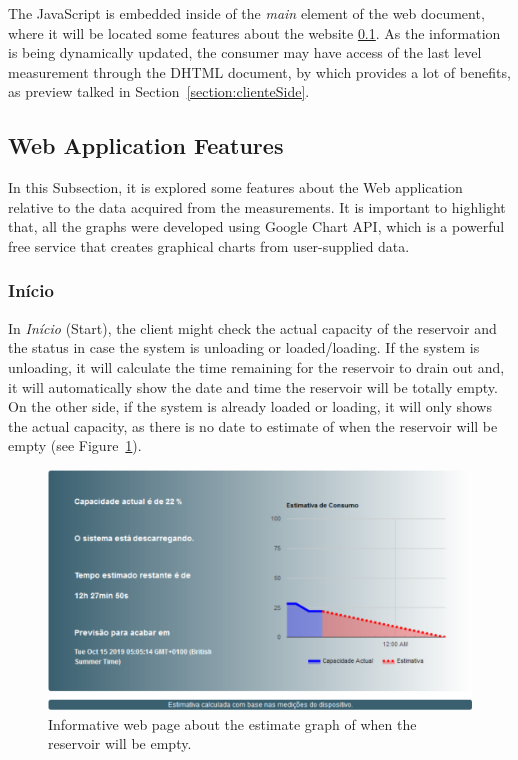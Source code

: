 The JavaScript is embedded inside of the \textit{main} element of the web document, where it will be located some features about the website \ref{subsection:features}. As the information is being dynamically updated, the consumer may have access of the last level measurement through the \gls{DHTML} document, by which provides a lot of benefits, as preview talked in Section~\ref{section:clienteSide}. 


\subsection{Web Application Features}\label{subsection:features}

In this Subsection, it is explored some features about the Web application relative to the data acquired from the measurements. It is important to highlight that, all the graphs were developed using Google Chart \gls{API}, which is a powerful free service that creates graphical charts from user-supplied data.


\subsubsection{Início}

In \textit{Início} (Start), the client might check the actual capacity of the reservoir and the status in case the system is unloading or loaded/loading. If the system is unloading, it will calculate the time remaining for the reservoir to drain out and, it will automatically show the date and time the reservoir will be totally empty. On the other side, if the system is already loaded or loading, it will only shows the actual capacity, as there is no date to estimate of when the reservoir will be empty (see Figure~\ref{fig:estimate}).

\begin{figure}[h!]
    \centering
    \includegraphics[scale=0.65]{images/Development/web_database/inicio1.pdf}
    \caption{Informative web page about the estimate graph of when the reservoir will be empty.}
    \label{fig:estimate}
\end{figure}

